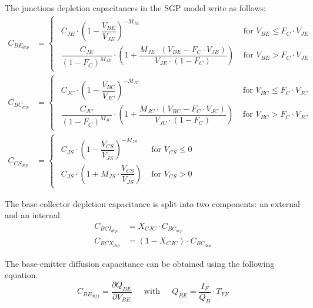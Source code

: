 \documentclass[10pt]{report}
\begin{document}
The junctions depletion capacitances in the SGP model write as
follows:
\begin{align}
C_{BE_{dep}} &= 
\begin{cases}
\begin{array}{ll}
C_{JE}\cdot \left(1 - \dfrac{V_{BE}}{V_{JE}}\right)^{-M_{JE}} & \textrm{ for } V_{BE} \le F_{C}\cdot V_{JE}\\
\dfrac{C_{JE}}{\left(1 - F_{C}\right)^{M_{JE}}}\cdot \left(1 + \dfrac{M_{JE}\cdot \left(V_{BE} - F_{C}\cdot V_{JE}\right)}{V_{JE}\cdot \left(1 - F_{C}\right)}\right) & \textrm{ for } V_{BE} > F_{C}\cdot V_{JE}
\end{array}
\end{cases}\\
C_{BC_{dep}} &= 
\begin{cases}
\begin{array}{ll}
C_{JC}\cdot \left(1 - \dfrac{V_{BC}}{V_{JC}}\right)^{-M_{JC}} & \textrm{ for } V_{BC} \le F_{C}\cdot V_{JC}\\
\dfrac{C_{JC}}{\left(1 - F_{C}\right)^{M_{JC}}}\cdot \left(1 + \dfrac{M_{JC}\cdot \left(V_{BC} - F_{C}\cdot V_{JC}\right)}{V_{JC}\cdot \left(1 - F_{C}\right)}\right) & \textrm{ for } V_{BC} > F_{C}\cdot V_{JC}
\end{array}
\end{cases}\\
C_{CS_{dep}} &= 
\begin{cases}
\begin{array}{ll}
C_{JS}\cdot \left(1 - \dfrac{V_{CS}}{V_{JS}}\right)^{-M_{JS}} & \textrm{ for } V_{CS} \le 0\\
C_{JS}\cdot \left(1 + M_{JS}\cdot \dfrac{V_{CS}}{V_{JS}}\right) & \textrm{ for } V_{CS} > 0
\end{array}
\end{cases}
\end{align}

The base-collector depletion capacitance is split into two components:
an external and an internal.
\begin{align}
C_{BCI_{dep}} &= X_{CJC}\cdot C_{BC_{dep}}\\
C_{BCX_{dep}} &= \left(1 - X_{CJC}\right)\cdot C_{BC_{dep}}
\end{align}

The base-emitter diffusion capacitance can be obtained using the
following equation.
\begin{equation}
C_{BE_{diff}} = \dfrac{\partial Q_{BE}}{\partial V_{BE}}
\;\;\;\; \text{ with } \;\;\;\;
Q_{BE} = \dfrac{I_F}{Q_B}\cdot T_{FF}
\end{equation}
\end{document}
